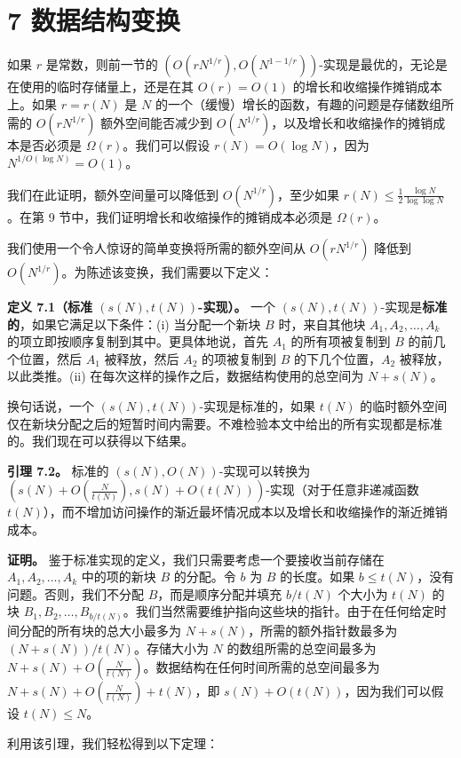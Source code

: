 \documentclass[12pt,a4paper]{ctexart}
\theoremstyle{remark}
\begin{document}
\section{7 数据结构变换}

如果 $r$ 是常数，则前一节的 $(O(rN^{1/r}),O(N^{1-1/r}))$-实现是最优的，无论是在使用的临时存储量上，还是在其 $O(r)=O(1)$ 的增长和收缩操作摊销成本上。如果 $r=r(N)$ 是 $N$ 的一个（缓慢）增长的函数，有趣的问题是存储数组所需的 $O(rN^{1/r})$ 额外空间能否减少到 $O(N^{1/r})$，以及增长和收缩操作的摊销成本是否必须是 $\Omega(r)$。我们可以假设 $r(N)=O(\log N)$，因为 $N^{1/O(\log N)}=O(1)$。

我们在此证明，额外空间量可以降低到 $O(N^{1/r})$，至少如果 $r(N)\leq\frac{1}{2}\frac{\log N}{\log\log N}$。在第 9 节中，我们证明增长和收缩操作的摊销成本必须是 $\Omega(r)$。

我们使用一个令人惊讶的简单变换将所需的额外空间从 $O(rN^{1/r})$ 降低到 $O(N^{1/r})$。为陈述该变换，我们需要以下定义：

\textbf{定义 7.1（标准 $(s(N),t(N))$-实现）。} 一个 $(s(N),t(N))$-实现是\textbf{标准的}，如果它满足以下条件：(i) 当分配一个新块 $B$ 时，来自其他块 $A_1,A_2,\ldots,A_k$ 的项立即按顺序复制到其中。更具体地说，首先 $A_1$ 的所有项被复制到 $B$ 的前几个位置，然后 $A_1$ 被释放，然后 $A_2$ 的项被复制到 $B$ 的下几个位置，$A_2$ 被释放，以此类推。(ii) 在每次这样的操作之后，数据结构使用的总空间为 $N+s(N)$。

换句话说，一个 $(s(N),t(N))$-实现是标准的，如果 $t(N)$ 的临时额外空间仅在新块分配之后的短暂时间内需要。不难检验本文中给出的所有实现都是标准的。我们现在可以获得以下结果。

\textbf{引理 7.2。} 标准的 $(s(N),O(N))$-实现可以转换为 $(s(N)+O(\frac{N}{t(N)}),s(N)+O(t(N)))$-实现（对于任意非递减函数 $t(N)$），而不增加访问操作的渐近最坏情况成本以及增长和收缩操作的渐近摊销成本。

\textbf{证明。} 鉴于标准实现的定义，我们只需要考虑一个要接收当前存储在 $A_1,A_2,\ldots,A_k$ 中的项的新块 $B$ 的分配。令 $b$ 为 $B$ 的长度。如果 $b\leq t(N)$，没有问题。否则，我们不分配 $B$，而是顺序分配并填充 $b/t(N)$ 个大小为 $t(N)$ 的块 $B_1,B_2,\ldots,B_{b/t(N)}$。我们当然需要维护指向这些块的指针。由于在任何给定时间分配的所有块的总大小最多为 $N+s(N)$，所需的额外指针数最多为 $(N+s(N))/t(N)$。存储大小为 $N$ 的数组所需的总空间最多为 $N+s(N)+O(\frac{N}{t(N)})$。数据结构在任何时间所需的总空间最多为 $N+s(N)+O(\frac{N}{t(N)})+t(N)$，即 $s(N)+O(t(N))$，因为我们可以假设 $t(N)\leq N$。

利用该引理，我们轻松得到以下定理：
\end{document}

